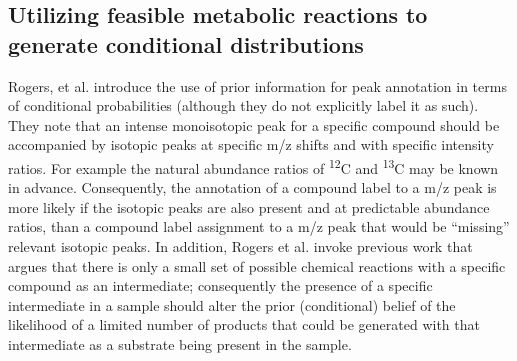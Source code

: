\begin{DoubleSpace*}
\section{Utilizing feasible metabolic reactions to generate conditional distributions}
Rogers, et al. \cite{rogers2009} introduce the use of prior information for peak annotation in terms of conditional probabilities (although they do not explicitly label it as such). They note that an intense monoisotopic peak for a specific compound should be accompanied by isotopic peaks at specific m/z shifts and with specific intensity ratios. For example the natural abundance ratios of \textsuperscript{12}C and \textsuperscript{13}C may be known in advance. Consequently, the annotation of a compound label to a m/z peak is more likely if the isotopic peaks are also present and at predictable abundance ratios, than a compound label assignment to a m/z peak that would be ``missing'' relevant isotopic peaks. In addition, Rogers et al. invoke previous work \cite{breitling2006} that argues that there is only a small set of possible chemical reactions with a specific compound as an intermediate; consequently the presence of a specific intermediate in a sample should alter the prior (conditional) belief of the likelihood of a limited number of products that could be generated with that intermediate as a substrate being present in the sample.


\end{DoubleSpace*}
